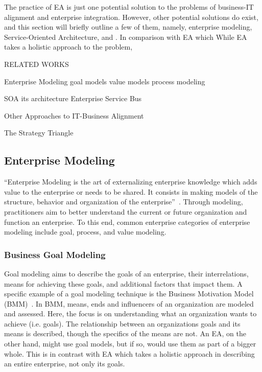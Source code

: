 The practice of EA is just one potential solution to the problems of business-IT alignment and enterprise integration. However, other potential solutions do exist, and this section will briefly outline a few of them, namely, enterprise modeling, Service-Oriented Architecture, and . In comparison with EA which While EA takes a holistic approach to the problem, 


RELATED WORKS

Enterprise Modeling
  goal models
  value models
  process modeling
  

SOA
  its architecture
  Enterprise Service Bus


Other Approaches to IT-Business Alignment
  
  The Strategy Triangle
  
\subsection{Enterprise Modeling}

``Enterprise Modeling is the art of externalizing enterprise knowledge which adds value to the enterprise or needs to be shared. It consists in making models of the structure, behavior and organization of the enterprise''~\cite{Vernadat200215}. Through modeling, practitioners aim to better understand the current or future organization and function an enterprise. To this end, common enterprise categories of enterprise modeling include goal, process, and value modeling. 

\subsubsection{Business Goal Modeling}

Goal modeling aims to describe the goals of an enterprise, their interrelations, means for achieving these goals, and additional factors that impact them. A specific example of a goal modeling technique is the Business Motivation Model (BMM)~\cite{bmm2010}. In BMM, means, ends and influencers of an organization are modeled and assessed. Here, the focus is on understanding what an organization wants to achieve (i.e. goals). The relationship between an organizations goals and its means is described, though the specifics of the means are not. An EA, on the other hand, might use goal models, but if so, would use them as part of a bigger whole. This is in contrast with EA which takes a holistic approach in describing an entire enterprise, not only its goals.


